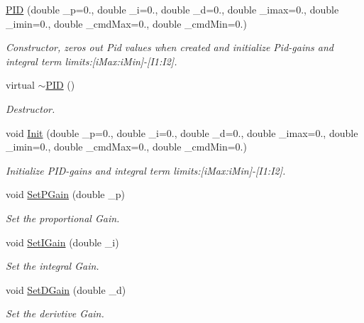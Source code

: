 \begin{DoxyCompactItemize}
\item 
\hyperlink{classnubot_1_1PID_ae71f7fb98fd3cd275d83dcc6ba37678e}{P\-I\-D} (double \-\_\-p=0., double \-\_\-i=0., double \-\_\-d=0., double \-\_\-imax=0., double \-\_\-imin=0., double \-\_\-cmd\-Max=0., double \-\_\-cmd\-Min=0.)
\begin{DoxyCompactList}\small\item\em Constructor, zeros out Pid values when created and initialize Pid-\/gains and integral term limits\-:\mbox{[}i\-Max\-:i\-Min\mbox{]}-\/\mbox{[}I1\-:I2\mbox{]}. \end{DoxyCompactList}\item 
virtual \hyperlink{classnubot_1_1PID_ab7d389fc5b88d881bc25f5dafd360441}{$\sim$\-P\-I\-D} ()
\begin{DoxyCompactList}\small\item\em Destructor. \end{DoxyCompactList}\item 
void \hyperlink{classnubot_1_1PID_a382ce53f7a1ad7d86cbd86a25a100ec7}{Init} (double \-\_\-p=0., double \-\_\-i=0., double \-\_\-d=0., double \-\_\-imax=0., double \-\_\-imin=0., double \-\_\-cmd\-Max=0., double \-\_\-cmd\-Min=0.)
\begin{DoxyCompactList}\small\item\em Initialize P\-I\-D-\/gains and integral term limits\-:\mbox{[}i\-Max\-:i\-Min\mbox{]}-\/\mbox{[}I1\-:I2\mbox{]}. \end{DoxyCompactList}\item 
void \hyperlink{classnubot_1_1PID_ae2e298baa50a7dee51d56ffe08c250a0}{Set\-P\-Gain} (double \-\_\-p)
\begin{DoxyCompactList}\small\item\em Set the proportional Gain. \end{DoxyCompactList}\item 
void \hyperlink{classnubot_1_1PID_a3787d609a4559005dcfc0d66565748aa}{Set\-I\-Gain} (double \-\_\-i)
\begin{DoxyCompactList}\small\item\em Set the integral Gain. \end{DoxyCompactList}\item 
void \hyperlink{classnubot_1_1PID_a93525f67c0152418f360074e8d6d970d}{Set\-D\-Gain} (double \-\_\-d)
\begin{DoxyCompactList}\small\item\em Set the derivtive Gain. \end{DoxyCompactList}\item 

\end{DoxyCompactItemize}
